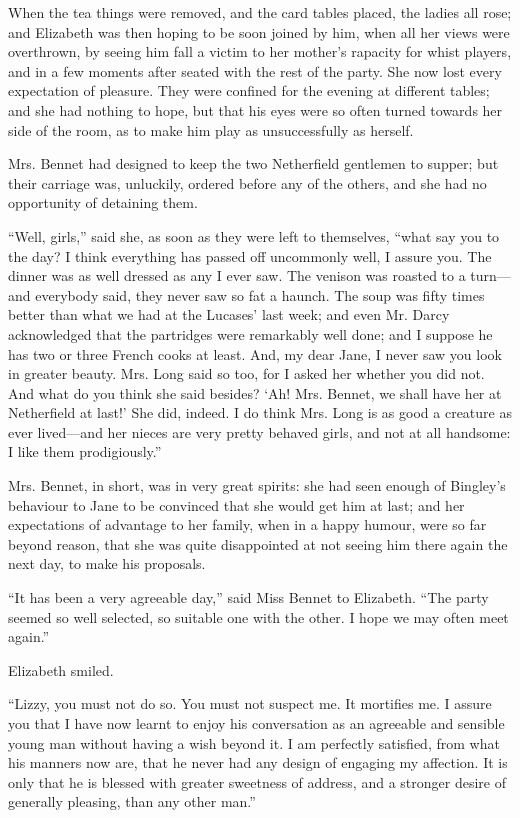 When the tea things were removed, and the card tables placed, the ladies all rose; and Elizabeth was then hoping to be soon joined by him, when all her views were overthrown, by seeing him fall a victim to her mother's rapacity for whist players, and in a few moments after seated with the rest of the party. She now lost every expectation of pleasure. They were confined for the evening at different tables; and she had nothing to hope, but that his eyes were so often turned towards her side of the room, as to make him play as unsuccessfully as herself.

Mrs. Bennet had designed to keep the two Netherfield gentlemen to supper; but their carriage was, unluckily, ordered before any of the others, and she had no opportunity of detaining them.

``Well, girls,'' said she, as soon as they were left to themselves, ``what say you to the day? I think everything has passed off uncommonly well, I assure you. The dinner was as well dressed as any I ever saw. The venison was roasted to a turn---and everybody said, they never saw so fat a haunch. The soup was fifty times better than what we had at the Lucases' last week; and even Mr. Darcy acknowledged that the partridges were remarkably well done; and I suppose he has two or three French cooks at least. And, my dear Jane, I never saw you look in greater beauty. Mrs. Long said so too, for I asked her whether you did not. And what do you think she said besides? `Ah! Mrs. Bennet, we shall have her at Netherfield at last!' She did, indeed. I do think Mrs. Long is as good a creature as ever lived---and her nieces are very pretty behaved girls, and not at all handsome: I like them prodigiously.''




Mrs. Bennet, in short, was in very great spirits: she had seen enough of Bingley's behaviour to Jane to be convinced that she would get him at last; and her expectations of advantage to her family, when in a happy humour, were so far beyond reason, that she was quite disappointed at not seeing him there again the next day, to make his proposals.

``It has been a very agreeable day,'' said Miss Bennet to Elizabeth. ``The party seemed so well selected, so suitable one with the other. I hope we may often meet again.''

Elizabeth smiled.

``Lizzy, you must not do so. You must not suspect me. It mortifies me. I assure you that I have now learnt to enjoy his conversation as an agreeable and sensible young man without having a wish beyond it. I am perfectly satisfied, from what his manners now are, that he never had any design of engaging my affection. It is only that he is blessed with greater sweetness of address, and a stronger desire of generally pleasing, than any other man.''


